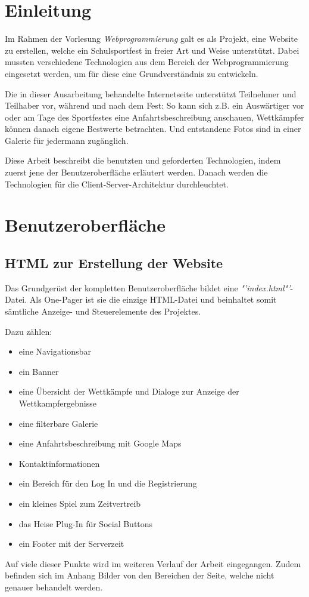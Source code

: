\chapter{Einleitung}
\label{Einleitung}
Im Rahmen der Vorlesung \textit{Webprogrammierung} galt es als Projekt, eine Website zu erstellen, welche ein Schulsportfest in freier Art und Weise unterstützt. Dabei mussten verschiedene Technologien aus dem Bereich der Webprogrammierung eingesetzt werden, um für diese eine Grundverständnis zu entwickeln.
\par
Die in dieser Ausarbeitung behandelte Internetseite unterstützt Teilnehmer und Teilhaber vor, während und nach dem Fest: So kann sich z.B. ein Auswärtiger vor oder am Tage des Sportfestes eine Anfahrtsbeschreibung anschauen, Wettkämpfer können danach eigene Bestwerte betrachten. Und entstandene Fotos sind in einer Galerie für jedermann zugänglich.
\par
Diese Arbeit beschreibt die benutzten und geforderten Technologien, indem zuerst jene der Benutzeroberfläche erläutert werden. Danach werden die Technologien für die Client-Server-Architektur durchleuchtet.

\chapter{Benutzeroberfläche}
\label{Benutzeroberfläche}

\section{HTML zur Erstellung der Website}
\label{HTML zur Erstellung der Website}
Das Grundgerüst der kompletten Benutzeroberfläche bildet eine \textit{"'index.html"'}-Datei. Als One-Pager ist sie die einzige HTML-Datei und beinhaltet somit sämtliche Anzeige- und Steuerelemente des Projektes.
\par
Dazu zählen:
\begin{itemize}
	\item eine Navigationsbar
	\item ein Banner
	\item eine Übersicht der Wettkämpfe und Dialoge zur Anzeige der Wettkampfergebnisse
	\item eine filterbare Galerie
	\item eine Anfahrtsbeschreibung mit Google Maps
	\item Kontaktinformationen
	\item ein Bereich für den Log In und die Registrierung \item ein kleines Spiel zum Zeitvertreib
	\item das Heise Plug-In für Social Buttons
	\item ein Footer mit der Serverzeit	
\end{itemize}
Auf viele dieser Punkte wird im weiteren Verlauf der Arbeit eingegangen. Zudem befinden sich im Anhang Bilder von den Bereichen der Seite, welche nicht genauer behandelt werden.

